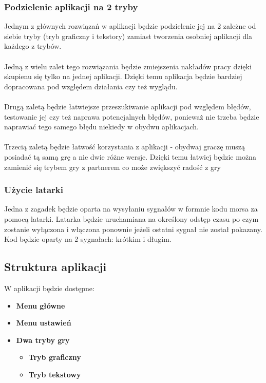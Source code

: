 \subsubsection{Podzielenie aplikacji na 2 tryby}
\hspace*{0.60cm}Jednym z głównych rozwiązań w aplikacji będzie podzielenie jej na 2 zależne od siebie tryby (tryb graficzny i tekstory) zamiast tworzenia osobniej aplikacji dla każdego z trybów.
\\
\\
Jedną z wielu zalet tego rozwiązania będzie zmiejszenia nakładów pracy dzięki skupienu się tylko na jednej aplikacji. Dzięki temu aplikacja będzie bardziej dopracowana pod względem działania czy też wyglądu.
\\
\\
Drugą zaletą będzie łatwiejsze przeszukiwanie aplikacji pod względem błędów, testowanie jej czy też naprawa potencjalnych błędów, ponieważ nie trzeba będzie naprawiać tego samego błędu niekiedy w obydwu aplikacjach.
\\
\\
Trzecią zaletą będzie łatwość korzystania z aplikacji - obydwaj graczę muszą posiadać tą samą grę a nie dwie różne wersje. Dzięki temu łatwiej będzie można zamienić się trybem gry z partnerem co może zwiększyć radość z gry


\subsubsection{Użycie latarki}
Jedna z zagadek będzie oparta na wysyłaniu sygnałów w formnie kodu morsa za pomocą latarki. Latarka będzie uruchamiana na określony odstęp czasu po czym zostanie wyłączona i włączona ponownie jeżeli ostatni sygnał nie został pokazany. Kod będzie oparty na 2 sygnałach: krótkim i długim.

\subsection{Struktura aplikacji}

\hspace*{0.60cm}W aplikacji będzie dostępne:
\begin{itemize}
	\item \textbf{Menu główne}
	\item \textbf{Menu ustawień} 
	\item   \textbf{Dwa tryby gry}
\begin{itemize}
	\item \textbf{Tryb graficzny}
	\item \textbf{Tryb tekstowy} 
\end{itemize}
\end{itemize}

